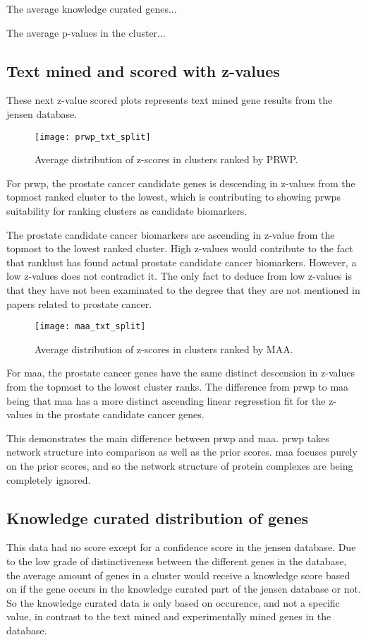 The average knowledge curated genes...

The average p-values in the cluster...

\subsection{Text mined and scored with z-values}
These next z-value scored plots represents text mined gene results from the
\gls{jensen} database.

\begin{sidewaysfigure}
    \label{fig:txt-iref-prwp}
    \texttt{[image: prwp\_txt\_split]}
    \caption{Average distribution of z-scores in clusters ranked by PRWP.}
\end{sidewaysfigure}
For \gls{prwp}, the prostate cancer candidate genes is descending in z-values
from the topmost ranked cluster to the lowest, which is contributing to
showing \gls{prwp}s suitability for ranking clusters as candidate biomarkers. 

The prostate candidate cancer biomarkers are ascending in z-value from the
topmost to the lowest ranked cluster. High z-values would contribute to the fact
that ranklust has found actual prostate candidate cancer biomarkers. However,
a low z-values does not contradict it. The only fact to deduce from low z-values
is that they have not been examinated to the degree that they are not mentioned
in papers related to prostate cancer.

\begin{sidewaysfigure}
    \label{fig:txt-iref-maa}
    \texttt{[image: maa\_txt\_split]}
    \caption{Average distribution of z-scores in clusters ranked by MAA.}
\end{sidewaysfigure}
For \gls{maa}, the prostate cancer genes have the same distinct descension in
z-values from the topmost to the lowest cluster ranks. The difference from
\gls{prwp} to \gls{maa} being that \gls{maa} has a more distinct ascending
linear regresstion fit for the z-values in the prostate candidate cancer genes.

This demonstrates the main difference between \gls{prwp} and \gls{maa}.
\gls{prwp} takes network structure into comparison as well as the prior scores.
\gls{maa} focuses purely on the prior scores, and so the network structure of
protein complexes are being completely ignored.

\subsection{Knowledge curated distribution of genes}
This data had no score except for a confidence score in the \gls{jensen}
database. Due to the low grade of distinctiveness between the different genes in
the database, the average amount of genes in a cluster would receive a knowledge
score based on if the gene occurs in the knowledge curated part of the
\gls{jensen} database or not. So the knowledge curated data is only based on
occurence, and not a specific value, in contrast to the text mined and
experimentally mined genes in the database.

